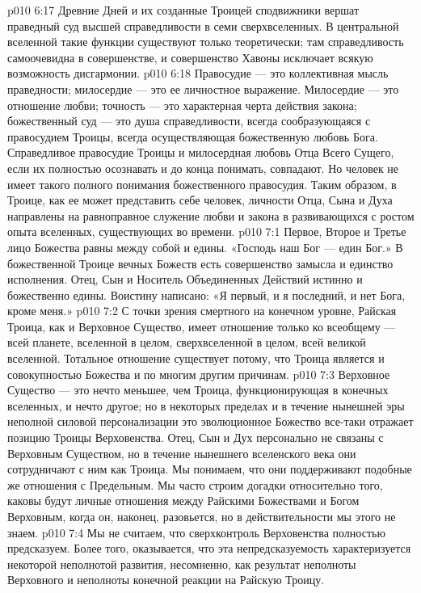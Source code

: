 \vs p010 6:17 Древние Дней и их созданные Троицей сподвижники вершат праведный суд высшей справедливости в семи сверхвселенных. В центральной вселенной такие функции существуют только теоретически; там справедливость самоочевидна в совершенстве, и совершенство Хавоны исключает всякую возможность дисгармонии.
\vs p010 6:18 Правосудие --- это коллективная мысль праведности; милосердие --- это ее личностное выражение. Милосердие --- это отношение любви; точность --- это характерная черта действия закона; божественный суд --- это душа справедливости, всегда сообразующаяся с правосудием Троицы, всегда осуществляющая божественную любовь Бога. Справедливое правосудие Троицы и милосердная любовь Отца Всего Сущего, если их полностью осознавать и до конца понимать, совпадают. Но человек не имеет такого полного понимания божественного правосудия. Таким образом, в Троице, как ее может представить себе человек, личности Отца, Сына и Духа направлены на равноправное служение любви и закона в развивающихся с ростом опыта вселенных, существующих во времени.
\vs p010 7:1 Первое, Второе и Третье лицо Божества равны между собой и едины. «Господь наш Бог --- един Бог.» В божественной Троице вечных Божеств есть совершенство замысла и единство исполнения. Отец, Сын и Носитель Объединенных Действий истинно и божественно едины. Воистину написано: «Я первый, и я последний, и нет Бога, кроме меня.»
\vs p010 7:2 \pc С точки зрения смертного на конечном уровне, Райская Троица, как и Верховное Существо, имеет отношение только ко всеобщему --- всей планете, вселенной в целом, сверхвселенной в целом, всей великой вселенной. Тотальное отношение существует потому, что Троица является и совокупностью Божества и по многим другим причинам.
\vs p010 7:3 Верховное Существо --- это нечто меньшее, чем Троица, функционирующая в конечных вселенных, и нечто другое; но в некоторых пределах и в течение нынешней эры неполной силовой персонализации это эволюционное Божество все\hyp{}таки отражает позицию Троицы Верховенства. Отец, Сын и Дух персонально не связаны с Верховным Существом, но в течение нынешнего вселенского века они сотрудничают с ним как Троица. Мы понимаем, что они поддерживают подобные же отношения с Предельным. Мы часто строим догадки относительно того, каковы будут личные отношения между Райскими Божествами и Богом Верховным, когда он, наконец, разовьется, но в действительности мы этого не знаем.
\vs p010 7:4 \pc Мы не считаем, что сверхконтроль Верховенства полностью предсказуем. Более того, оказывается, что эта непредсказуемость характеризуется некоторой неполнотой развития, несомненно, как результат неполноты Верховного и неполноты конечной реакции на Райскую Троицу.

